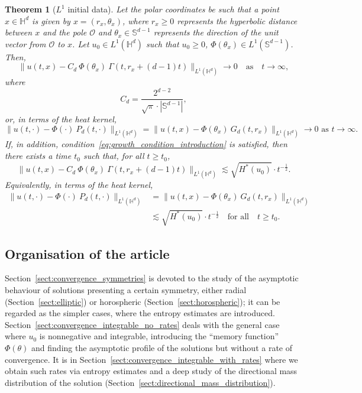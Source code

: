 \documentclass[12pt,longbibliography]{article}
\def\S{\mathbb{S}}
\def\H{\mathbb{H}}
\newtheorem{thm}{Theorem}[section]
\theoremstyle{definition}
\theoremstyle{remark}
\theoremstyle{example}
\begin{document}
\begin{thm}[$L^1$ initial data]
	Let the polar coordinates be such that a point $x\in\H^d$ is given by $x=(r_x, \theta_x)$, where $r_x\geq 0$ represents the hyperbolic distance between $x$ and the pole $\mathcal{O}$ and $\theta_x\in\S^{d-1}$ represents the direction of the unit vector from $\mathcal{O}$ to $x$. Let $u_0\in L^1(\H^d)$ such that $u_0\geq 0$, $\Phi(\theta_x)\in L^1(\S^{d-1})$. Then,
	\[
	\| u(t,x) - C_d\ \Phi(\theta_x)\ \Gamma(t, r_x+(d-1)t) \|_{L^1(\mathbb{H}^d)}\to 0\quad\text{as}\quad t\to \infty,
	\]
	where
	\[
	C_d=\frac{2^{d-2}}{\sqrt{\pi}\cdot |\S^{d-1}|},
	\]
	or, in terms of the heat kernel,
	\[
	\| u(t,\cdot) - \Phi(\cdot)\ P_d(t,\cdot) \|_{L^1(\mathbb{H}^d)}=\| u(t,x) - \Phi(\theta_x)\ G_d(t,r_x) \|_{L^1(\mathbb{H}^d)}\to 0\text{ as } t\to \infty.
	\]
	If, in addition, condition~\eqref{eq:growth_condition_introduction} is satisfied, then there exists a time $t_0$ such that, for all $t\geq t_0$,
	\[
	\| u(t,x) - C_d\ \Phi(\theta_x)\ \Gamma(t, r_x+(d-1)t) \|_{L^1(\mathbb{H}^d)}  \lesssim \sqrt{H^*(u_0)}\cdot t^{-\frac{1}{2}}.
	\]
	Equivalently, in terms of the heat kernel,
	\[
	\begin{aligned}
	\| u(t,\cdot) - \Phi(\cdot)\ P_d(t,\cdot) \|_{L^1(\mathbb{H}^d)}&=\| u(t,x) - \Phi(\theta_x)\ G_d(t,r_x) \|_{L^1(\mathbb{H}^d)}\\[10pt]
	&\lesssim \sqrt{H^*(u_0)}\cdot t^{-\frac{1}{2}}\quad \text{for all}\quad t\geq t_0.
	\end{aligned}
	\]
\end{thm}


\subsection{Organisation of the article}

Section~\ref{sect:convergence_symmetries} is devoted to the study of the asymptotic behaviour of solutions presenting a certain symmetry, either radial (Section~\ref{sect:elliptic}) or horospheric (Section~\ref{sect:horospheric}); it can be regarded as the simpler cases, where the entropy estimates are introduced. Section~\ref{sect:convergence_integrable_no_rates} deals with the general case where $u_0$ is nonnegative and integrable, introducing the ``memory function'' $\Phi(\theta)$ and finding the asymptotic profile of the solutions but without a rate of convergence. It is in Section~\ref{sect:convergence_integrable_with_rates} where we obtain such rates via entropy estimates and a deep study of the directional mass distribution of the solution (Section~\ref{sect:directional_mass_distribution}). 
\end{document}
